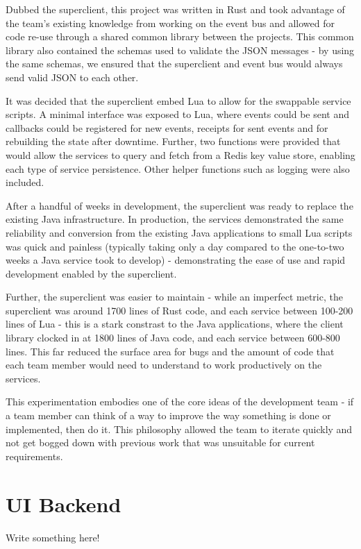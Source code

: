 \documentclass{l3proj}
\begin{document}
Dubbed the superclient, this project was written in Rust and took advantage of the team's existing knowledge from working on the event bus and allowed for code re-use through a shared common library between the projects. This common library also contained the schemas used to validate the JSON messages - by using the same schemas, we ensured that the superclient and event bus would always send valid JSON to each other.

It was decided that the superclient embed Lua to allow for the swappable service scripts. A minimal interface was exposed to Lua, where events could be sent and callbacks could be registered for new events, receipts for sent events and for rebuilding the state after downtime. Further, two functions were provided that would allow the services to query and fetch from a Redis key value store, enabling each type of service persistence. Other helper functions such as logging were also included.

After a handful of weeks in development, the superclient was ready to replace the existing Java infrastructure. In production, the services demonstrated the same reliability and conversion from the existing Java applications to small Lua scripts was quick and painless (typically taking only a day compared to the one-to-two weeks a Java service took to develop) - demonstrating the ease of use and rapid development enabled by the superclient.

Further, the superclient was easier to maintain - while an imperfect metric, the superclient was around 1700 lines of Rust code, and each service between 100-200 lines of Lua - this is a stark constrast to the Java applications, where the client library clocked in at 1800 lines of Java code, and each service between 600-800 lines. This far reduced the surface area for bugs and the amount of code that each team member would need to understand to work productively on the services.

This experimentation embodies one of the core ideas of the development team - if a team member can think of a way to improve the way something is done or implemented, then do it. This philosophy allowed the team to iterate quickly and not get bogged down with previous work that was unsuitable for current requirements.

\section{UI Backend}
\label{sec:backend}
Write something here!
\end{document}
